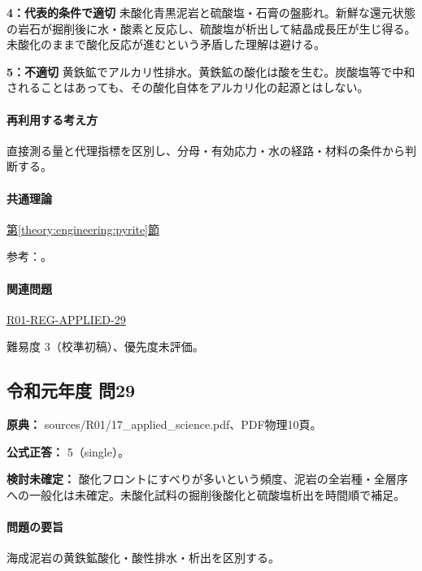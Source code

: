 \noindent\textbf{4：代表的条件で適切} 未酸化青黒泥岩と硫酸塩・石膏の盤膨れ。新鮮な還元状態の岩石が掘削後に水・酸素と反応し、硫酸塩が析出して結晶成長圧が生じ得る。未酸化のままで酸化反応が進むという矛盾した理解は避ける。\par

\noindent\textbf{5：不適切} 黄鉄鉱でアルカリ性排水。黄鉄鉱の酸化は酸を生む。炭酸塩等で中和されることはあっても、その酸化自体をアルカリ化の起源とはしない。\par

\paragraph{再利用する考え方} 直接測る量と代理指標を区別し、分母・有効応力・水の経路・材料の条件から判断する。

\paragraph{共通理論} \hyperref[theory:engineering:pyrite]{第\ref*{theory:engineering:pyrite}節}

\par 参考：\cite{eng52_weathering,eng52_slip_weaklayer}。

\paragraph{関連問題} \hyperref[q:r01-reg-applied-29]{R01-REG-APPLIED-29}

\par 難易度 3（校準初稿）、優先度未評価。

\subsection{令和元年度 問29}
\label{q:r01-reg-applied-29}

\noindent\textbf{原典：} sources/R01/17\_applied\_science.pdf、PDF物理10頁。

\textbf{公式正答：} 5（single）。

\par\textbf{検討未確定：} 酸化フロントにすべりが多いという頻度、泥岩の全岩種・全層序への一般化は未確定。未酸化試料の掘削後酸化と硫酸塩析出を時間順で補足。

\paragraph{問題の要旨} 海成泥岩の黄鉄鉱酸化・酸性排水・析出を区別する。

